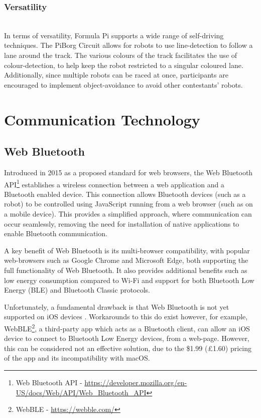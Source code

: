\documentclass{l4proj}
\begin{document}
\subsubsection{Versatility} \hfill \\
In terms of versatility, Formula Pi supports a wide range of self-driving techniques. The PiBorg Circuit allows for robots to use line-detection to follow a lane around the track. The various colours of the track facilitates the use of colour-detection, to help keep the robot restricted to a singular coloured lane. Additionally, since multiple robots can be raced at once, participants are encouraged to implement object-avoidance to avoid other contestants' robots.


\section{Communication Technology}\label{sec:communication-tech}
\subsection{Web Bluetooth}\label{sec:bluetooth-background}
Introduced in 2015 as a proposed standard for web browsers, the Web Bluetooth API\footnote{Web Bluetooth API - \url{https://developer.mozilla.org/en-US/docs/Web/API/Web_Bluetooth_API}} establishes a wireless connection between a web application and a Bluetooth enabled device. This connection allows Bluetooth devices (such as a robot) to be controlled using JavaScript running from a web browser (such as on a mobile device). This provides a simplified approach, where communication can occur seamlessly, removing the need for installation of native applications to enable Bluetooth communication.

A key benefit of Web Bluetooth is its multi-browser compatibility, with popular web-browsers such as Google Chrome and Microsoft Edge, both supporting the full functionality of Web Bluetooth. It also provides additional benefits such as low energy consumption compared to Wi-Fi and support for both Bluetooth Low Energy (BLE) and Bluetooth Classic protocols.

Unfortunately, a fundamental drawback is that Web Bluetooth is not yet supported on iOS devices \citep{webbluetooth}. Workarounds to this do exist however, for example, WebBLE\footnote{WebBLE - \url{https://webble.com/}}, a third-party app which acts as a Bluetooth client, can allow an iOS device to connect to Bluetooth Low Energy devices, from a web-page. However, this can be considered not an effective solution, due to the \$1.99 (£1.60) pricing of the app and its incompatibility with macOS.
\end{document}
